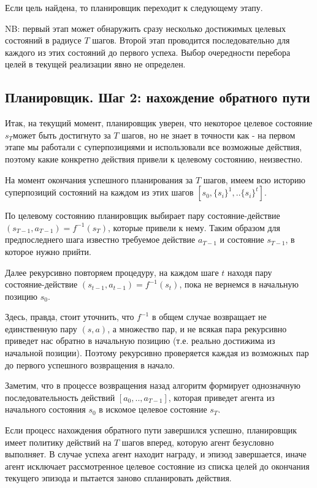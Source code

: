 \documentclass[a4paper]{article}
\begin{document}
Если цель найдена, то планировщик переходит к следующему этапу.

NB: первый этап может обнаружить сразу несколько достижимых целевых состояний в радиусе $T$ шагов. Второй этап проводится последовательно для каждого из этих состояний до первого успеха. Выбор очередности перебора целей в текущей реализации явно не определен.

\subsection{Планировщик. Шаг 2: нахождение обратного пути}

Итак, на текущий момент, планировщик уверен, что некоторое целевое состояние $s_T$может быть достигнуто за $T$ шагов, но не знает в точности как - на первом этапе мы работали с суперпозициями и использовали все возможные действия, поэтому какие конкретно действия привели к целевому состоянию, неизвестно.

На момент окончания успешного планирования за $T$ шагов, имеем всю историю суперпозиций состояний на каждом из этих шагов $[s_0, \{s_i\}^1, .. \{s_i\}^t]$.

По целевому состоянию планировщик выбирает пару состояние-действие $(s_{T-1}, a_{T-1}) = f^{-1}(s_T)$, которые привели к нему. Таким образом для предпоследнего шага известно требуемое действие $a_{T-1}$ и состояние $s_{T-1}$, в которое нужно прийти.

Далее рекурсивно повторяем процедуру, на каждом шаге $t$ находя пару состояние-действие $(s_{t-1}, a_{t-1}) = f^{-1}(s_t)$, пока не вернемся в начальную позицию $s_0$.

Здесь, правда, стоит уточнить, что $f^{-1}$ в общем случае возвращает не единственную пару $(s, a)$, а множество пар, и не всякая пара рекурсивно приведет нас обратно в начальную позицию (т.е. реально достижима из начальной позиции). Поэтому рекурсивно проверяется каждая из возможных пар до первого успешного возвращения в начало.

Заметим, что в процессе возвращения назад алгоритм формирует однозначную последовательность действий $[a_0, .. , a_{T-1}]$, которая приведет агента из начального состояния $s_0$ в искомое целевое состояние $s_T$.

Если процесс нахождения обратного пути завершился успешно, планировщик имеет политику действий на $T$ шагов вперед, которую агент безусловно выполняет. В случае успеха агент находит награду, и эпизод завершается, иначе агент исключает рассмотренное целевое состояние из списка целей до окончания текущего эпизода и пытается заново спланировать действия.
\end{document}
